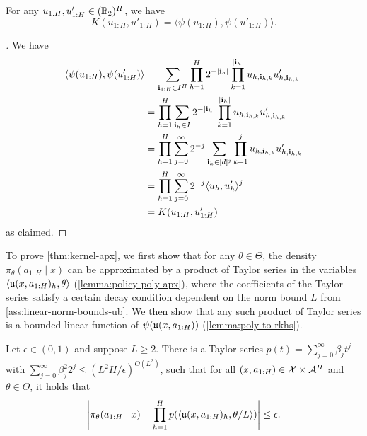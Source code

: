 \begin{lemma}\label{lemma:psi-k}
For any $u_{1:H},u'_{1:H} \in (\mathbb{B}_2)^H$, we have
\[K(u_{1:H},u'_{1:H}) = \langle \psi(u_{1:H}), \psi(u'_{1:H})\rangle.\]
\end{lemma}

\begin{proof}[]
We have
\begin{align}
\langle \psi(u_{1:H}),\psi(u'_{1:H})\rangle 
&= \sum_{\mathbf{i}_{1:H} \in I^H} \prod_{h=1}^H 2^{-|\mathbf{i}_h|} \prod_{k=1}^{|\mathbf{i}_h|} u_{h,\mathbf{i}_{h,k}}u'_{h,\mathbf{i}_{h,k}} \\ 
&= \prod_{h=1}^H \sum_{\mathbf{i}_h \in I}
2^{-|\mathbf{i}_h|} \prod_{k=1}^{|\mathbf{i}_h|} u_{h,\mathbf{i}_{h,k}}u'_{h,\mathbf{i}_{h,k}} \\
&= \prod_{h=1}^H \sum_{j=0}^\infty 2^{-j} \sum_{\mathbf{i}_h \in [d]^j} \prod_{k=1}^j u_{h,\mathbf{i}_{h,k}}u'_{h,\mathbf{i}_{h,k}} \\ 
&= \prod_{h=1}^H \sum_{j=0}^\infty 2^{-j} \langle u_h,u'_h\rangle^j \\ 
&= K(u_{1:H},u'_{1:H})
\end{align}
as claimed.
\end{proof}

To prove \cref{thm:kernel-apx}, we first show that for any $\theta \in \Theta$, the density $\pi_\theta(a_{1:H}\mid{}x)$ can be approximated by a product of Taylor series in the variables $\langle \mathfrak{u}(x,a_{1:H})_h, \theta\rangle$ (\cref{lemma:policy-poly-apx}), where the coefficients of the Taylor series satisfy a certain decay condition dependent on the norm bound $L$ from \cref{ass:linear-norm-bounds-ub}. We then show that any such product of Taylor series is a bounded linear function of $\psi(\mathfrak{u}(x,a_{1:H}))$ (\cref{lemma:poly-to-rkhs}).

\begin{lemma}\label{lemma:policy-poly-apx}
Let $\epsilon \in (0,1)$ and suppose $L \geq 2$. There is a Taylor series $p(t) = \sum_{j=0}^\infty \beta_j t^j$ with $\sum_{j=0}^\infty \beta_j^2 2^j \leq (L^2H/\epsilon)^{O(L^2)}$, such that for all $(x,a_{1:H}) \in \mathcal{X}\times\mathcal{A}^H$ and $\theta \in \Theta$, it holds that
\[\left|\pi_\theta(a_{1:H}\mid{}x) - \prod_{h=1}^H p(\langle \mathfrak{u}(x,a_{1:H})_h,\theta/L\rangle)\right| \leq \epsilon.\]
\end{lemma}


